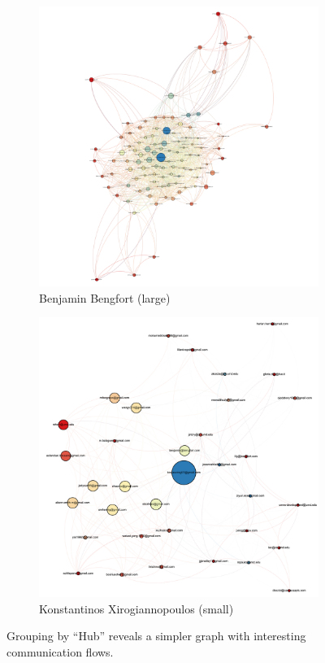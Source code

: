 \documentclass[11pt,letterpaper]{article}
\begin{document}
\begin{figure}[h]
	\centering
	\begin{subfigure}{0.49\textwidth}
		\centering
		\includegraphics[width=\textwidth]{figures/benjamin_simplification.png}
		\caption{\textsf{Benjamin Bengfort (large)}}
        \label{fig:benjamin_simplification}
	\end{subfigure} \hfill
	\begin{subfigure}{0.49\textwidth}
		\centering
		\includegraphics[width=\textwidth]{figures/kostas_simplification.png}
		\caption{\textsf{Konstantinos Xirogiannopoulos (small)}}
        \label{fig:kostas_simplification}
	\end{subfigure}
    \caption{\textsf{Grouping by ``Hub'' reveals a simpler graph with interesting communication flows.}}
    \label{fig:simplification}
\end{figure}
\end{document}
